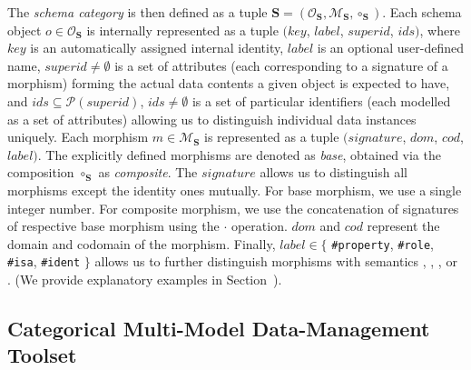 The \textit{schema category} is then defined as a tuple $\mathbf{S} = (\mathcal{O}_\mathbf{S}, \mathcal{M}_\mathbf{S}, \circ_\mathbf{S})$. Each schema object $o \in \mathcal{O}_\mathbf{S}$ is internally represented as a tuple $(key$, $label$, $superid$, $ids)$, where $key$ is an automatically assigned internal identity, $label$ is an optional user-defined name, $superid \ne \emptyset$ is a set of attributes (each corresponding to a signature of a morphism) forming the actual data contents a given object is expected to have, and $ids \subseteq \mathcal{P}(superid)$, $ids \ne \emptyset$ is a set of particular identifiers (each modelled as a set of attributes) allowing us to distinguish individual data instances uniquely.
Each morphism $m \in \mathcal{M}_\mathbf{S}$ is represented as a tuple $(signature$, $dom$, $cod$, $label)$. The explicitly defined morphisms are denoted as \textit{base}, obtained via the composition $\circ_\mathbf{S}$ as \textit{composite}. The $signature$ allows us to distinguish all morphisms except the identity ones mutually. For base morphism, we use a single integer number. For composite morphism, we use the concatenation of signatures of respective base morphism using the $\cdot$ operation. $dom$ and $cod$ represent the domain and codomain of the morphism. Finally, $label \in \{$ \texttt{\#property}, \texttt{\#role}, \texttt{\#isa}, \texttt{\#ident} $\}$ allows us to further distinguish morphisms with semantics , , , or . (We provide explanatory examples in Section~).





\subsection{Categorical Multi-Model Data-Management Toolset}

